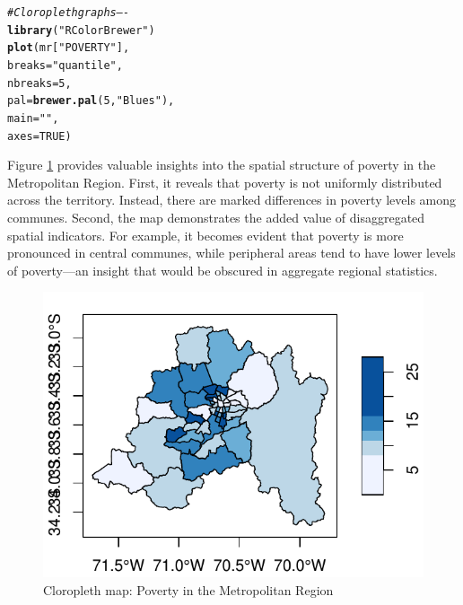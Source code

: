 \documentclass[english,12pt]{book}\usepackage[]{graphicx}\usepackage[]{xcolor}
\makeatletter
\def\maxwidth{ %
  \ifdim\Gin@nat@width>\linewidth
    \linewidth
  \else
    \Gin@nat@width
  \fi
}
\newcommand{\hlnum}[1]{\textcolor[rgb]{0.686,0.059,0.569}{#1}}%
\newcommand{\hlsng}[1]{\textcolor[rgb]{0.192,0.494,0.8}{#1}}%
\newcommand{\hlcom}[1]{\textcolor[rgb]{0.678,0.584,0.686}{\textit{#1}}}%
\newcommand{\hldef}[1]{\textcolor[rgb]{0.345,0.345,0.345}{#1}}%
\newcommand{\hlkwc}[1]{\textcolor[rgb]{0.333,0.667,0.333}{#1}}%
\newcommand{\hlkwd}[1]{\textcolor[rgb]{0.737,0.353,0.396}{\textbf{#1}}}%
\newenvironment{kframe}{%
 \def\at@end@of@kframe{}%
 \ifinner\ifhmode%
  \def\at@end@of@kframe{\end{minipage}}%
  \begin{minipage}{\columnwidth}%
 \fi\fi%
 \def\FrameCommand##1{\hskip\@totalleftmargin \hskip-\fboxsep
 \colorbox{shadecolor}{##1}\hskip-\fboxsep
     \hskip-\linewidth \hskip-\@totalleftmargin \hskip\columnwidth}%
 \MakeFramed {\advance\hsize-\width
   \@totalleftmargin\z@ \linewidth\hsize
   \@setminipage}}%
 {\par\unskip\endMakeFramed%
 \at@end@of@kframe}
\newenvironment{knitrout}{}{} %
\makeatother
\begin{document}
\begin{knitrout}
\color{fgcolor}\begin{kframe}
\begin{alltt}
\hlcom{# Cloropleth graphs ----}
\hlkwd{library}\hldef{(}\hlsng{"RColorBrewer"}\hldef{)}
\hlkwd{plot}\hldef{(mr[}\hlsng{"POVERTY"}\hldef{],}
       \hlkwc{breaks} \hldef{=} \hlsng{"quantile"}\hldef{,}
       \hlkwc{nbreaks} \hldef{=} \hlnum{5}\hldef{,}
       \hlkwc{pal} \hldef{=} \hlkwd{brewer.pal}\hldef{(}\hlnum{5}\hldef{,} \hlsng{"Blues"}\hldef{),}
       \hlkwc{main} \hldef{=} \hlsng{""}\hldef{,}
       \hlkwc{axes} \hldef{=} \hlnum{TRUE}\hldef{)}
\end{alltt}
\end{kframe}
\end{knitrout}

Figure \ref{fig:cloro-graph} provides valuable insights into the spatial structure of poverty in the Metropolitan Region. First, it reveals that poverty is not uniformly distributed across the territory. Instead, there are marked differences in poverty levels among communes. Second, the map demonstrates the added value of disaggregated spatial indicators. For example, it becomes evident that poverty is more pronounced in central communes, while peripheral areas tend to have lower levels of poverty—an insight that would be obscured in aggregate regional statistics.


\begin{figure}
\caption{Cloropleth map: Poverty in the Metropolitan Region}\label{fig:cloro-graph}
\begin{knitrout}
\color{fgcolor}

{\centering \includegraphics[width=\maxwidth]{figure/cloro-graphs-1} 

}


\end{knitrout}
\end{figure}
\end{document}
